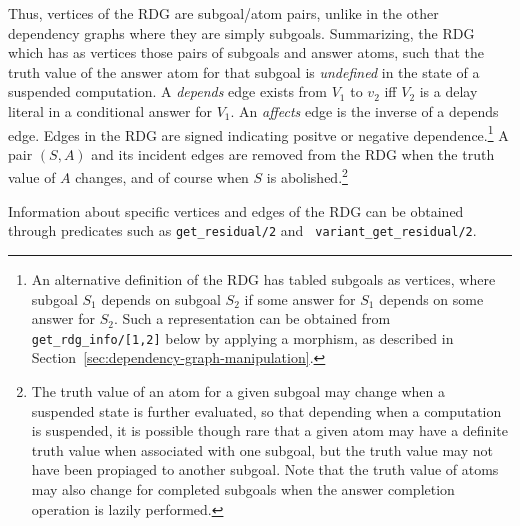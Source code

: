 Thus, vertices of the RDG are subgoal/atom pairs, unlike in the other
dependency graphs where they are simply subgoals.  Summarizing, the
RDG which has as vertices those pairs of subgoals and answer atoms,
such that the truth value of the answer atom for that subgoal is {\em
  undefined} in the state of a suspended computation.  A {\em depends}
edge exists from $V_1$ to $v_2$ iff $V_2$ is a delay literal in a
conditional answer for $V_1$.  An {\em affects} edge is the inverse of
a depends edge.  Edges in the RDG are signed indicating positve or
negative dependence.\footnote{An alternative definition of the RDG has
  tabled subgoals as vertices, where subgoal $S_1$ depends on subgoal
  $S_2$ if some answer for $S_1$ depends on some answer for $S_2$.
  Such a representation can be obtained from {\tt
    get\_rdg\_info/[1,2]} below by applying a morphism, as described
  in Section~\ref{sec:dependency-graph-manipulation}.}
%
  A pair $(S,A)$ and its incident edges are removed from the RDG when
  the truth value of $A$ changes, and of course when $S$ is
  abolished.\footnote{The truth value of an atom for a given subgoal may
    change when a suspended state is further evaluated, so that depending when
  a computation is suspended, it is possible though rare that a given
  atom may have a definite truth value when associated with one
  subgoal, but the truth value may not have been propiaged to another
  subgoal.  Note that the truth value of atoms may also change for
  completed subgoals when the {\sc answer completion} operation is
  lazily performed.}

Information about specific vertices and edges of the RDG can be
obtained through predicates such as {\tt get\_residual/2} and {\tt
  variant\_get\_residual/2}.

